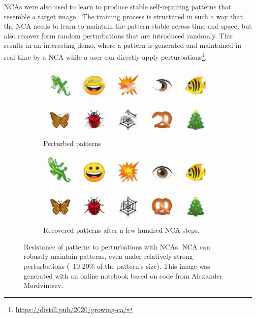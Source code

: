 \acp{NCA} were also used to learn to produce stable self-repairing patterns that
resemble a target image \parencite{mordvintsevGrowingNeuralCellular2020}. The
training process is structured in such a way that the \ac{NCA} needs to learn to
maintain the pattern stable across time and space, but also recover form random
perturbations that are introduced randomly. This results in an interesting demo,
where a pattern is generated and maintained in real time by a \ac{NCA} while a
user can directly apply
perturbations\footnote{\url{https://distill.pub/2020/growing-ca/}}.

\begin{figure}[htbp]
  \centering
  \begin{subfigure}[t]{.49\linewidth}
    \centering
    \includegraphics[width=\linewidth]{figures/nca_perturb.png}
    \caption{Perturbed patterns}
    \label{fig:nca_perturb}
  \end{subfigure}
  \begin{subfigure}[t]{.49\linewidth}
    \centering
    \includegraphics[width=\linewidth]{figures/nca_recover.png}
    \caption{Recovered patterns after a few hundred \ac{NCA} steps.}
    \label{fig:nca_recover}
  \end{subfigure}
  \caption[Resistance of patterns]{Resistance of patterns to perturbations with
    \acp{NCA}. \ac{NCA} can robustly maintain patterns, even under relatively
    strong perturbations (~10-20\% of the pattern's size). This image was
    generated with an online notebook based on code from Alexander
    Mordvintsev\footnotemark.}
  \label{fig:nca}
\end{figure}

